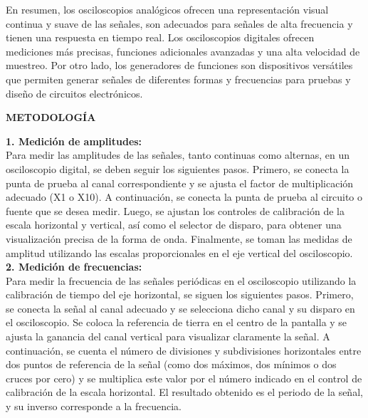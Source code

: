 \documentclass[12pt]{article}
\begin{document}
        En resumen, los osciloscopios analógicos ofrecen una representación visual continua y suave de las señales, son adecuados para señales de alta frecuencia y tienen una respuesta en tiempo real. Los osciloscopios digitales ofrecen mediciones más precisas, funciones adicionales avanzadas y una alta velocidad de muestreo. Por otro lado, los generadores de funciones son dispositivos versátiles que permiten generar señales de diferentes formas y frecuencias para pruebas y diseño de circuitos electrónicos.
        
	\newpage
	
	\begin{center}
		\textbf{\large METODOLOGÍA}\\
	\end{center}

        \textbf{1. Medición de amplitudes:}\\
        
        Para medir las amplitudes de las señales, tanto continuas como alternas, en un osciloscopio digital, se deben seguir los siguientes pasos. Primero, se conecta la punta de prueba al canal correspondiente y se ajusta el factor de multiplicación adecuado (X1 o X10). A continuación, se conecta la punta de prueba al circuito o fuente que se desea medir. Luego, se ajustan los controles de calibración de la escala horizontal y vertical, así como el selector de disparo, para obtener una visualización precisa de la forma de onda. Finalmente, se toman las medidas de amplitud utilizando las escalas proporcionales en el eje vertical del osciloscopio.\\

        \textbf{2. Medición de frecuencias:}\\
        
        Para medir la frecuencia de las señales periódicas en el osciloscopio utilizando la calibración de tiempo del eje horizontal, se siguen los siguientes pasos. Primero, se conecta la señal al canal adecuado y se selecciona dicho canal y su disparo en el osciloscopio. Se coloca la referencia de tierra en el centro de la pantalla y se ajusta la ganancia del canal vertical para visualizar claramente la señal. A continuación, se cuenta el número de divisiones y subdivisiones horizontales entre dos puntos de referencia de la señal (como dos máximos, dos mínimos o dos cruces por cero) y se multiplica este valor por el número indicado en el control de calibración de la escala horizontal. El resultado obtenido es el periodo de la señal, y su inverso corresponde a la frecuencia.\\
\end{document}
